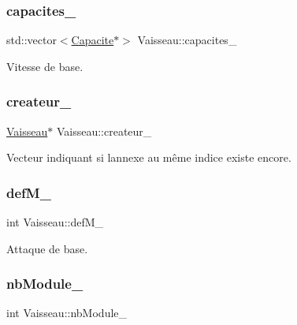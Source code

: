 \subsubsection{\texorpdfstring{capacites\+\_\+}{capacites\_}}
{\footnotesize\ttfamily std\+::vector$<$\hyperlink{class_capacite}{Capacite}$\ast$$>$ Vaisseau\+::capacites\+\_\+\hspace{0.3cm}{\ttfamily [protected]}}



Vitesse de base. 

\mbox{\label{class_vaisseau_a838e50295284e3b4996640054ab7ee30}} 
\subsubsection{\texorpdfstring{createur\+\_\+}{createur\_}}
{\footnotesize\ttfamily \hyperlink{class_vaisseau}{Vaisseau}$\ast$ Vaisseau\+::createur\+\_\+\hspace{0.3cm}{\ttfamily [protected]}}



Vecteur indiquant si l\textquotesingle{}annexe au même indice existe encore. 

\mbox{\label{class_vaisseau_ad62e88bb7527f72a6a446d9bbb219744}} 
\subsubsection{\texorpdfstring{def\+M\+\_\+}{defM\_}}
{\footnotesize\ttfamily int Vaisseau\+::def\+M\+\_\+\hspace{0.3cm}{\ttfamily [protected]}}



Attaque de base. 

\mbox{\label{class_vaisseau_a540cc03e47db59aad60d70be38a010ec}} 
\subsubsection{\texorpdfstring{nb\+Module\+\_\+}{nbModule\_}}
{\footnotesize\ttfamily int Vaisseau\+::nb\+Module\+\_\+\hspace{0.3cm}{\ttfamily [protected]}}



